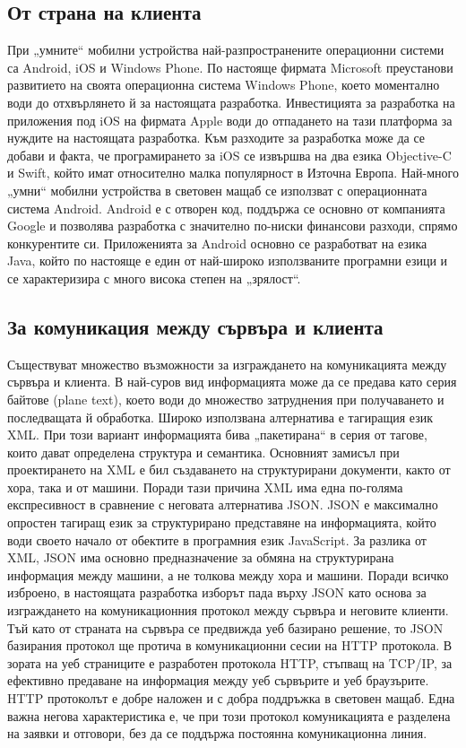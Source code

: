 \documentclass[book,14pt,oneside,openany]{memoir}
\begin{document}
\subsection{От страна на клиента}

При „умните“ мобилни устройства най-разпространените операционни системи са Android, iOS и Windows Phone. По настояще фирмата Microsoft преустанови развитието на своята операционна система Windows Phone, което моментално води до отхвърлянето й за настоящата разработка. Инвестицията за разработка на приложения под iOS на фирмата Apple води до отпадането на тази платформа за нуждите на настоящата разработка. Към разходите за разработка може да се добави и факта, че програмирането за iOS се извършва на два езика Objective-C и Swift, който имат относително малка популярност в Източна Европа. Най-много „умни“ мобилни устройства в световен мащаб се използват с операционната система Android. Android е с отворен код, поддържа се основно от компанията Google и позволява разработка с значително по-ниски финансови разходи, спрямо конкурентите си. Приложенията за Android основно се разработват на езика Java, който по настояще е един от най-широко използваните програмни езици и се характеризира с много висока степен на „зрялост“. 

\subsection{За комуникация между сървъра и клиента}

Съществуват множество възможности за изграждането на комуникацията между сървъра и клиента. В най-суров вид информацията може да се предава като серия байтове (plane text), което води до множество затруднения при получаването и последващата й обработка. Широко използвана алтернатива е тагиращия език XML. При този вариант информацията бива „пакетирана“ в серия от тагове, които дават определена структура и семантика. Основният замисъл при проектирането на XML е бил създаването на структурирани документи, както от хора, така и от машини. Поради тази причина XML има една по-голяма експресивност в сравнение с неговата алтернатива JSON. JSON е максимално опростен тагиращ език за структурирано представяне на информацията, който води своето начало от обектите в програмния език JavaScript. За разлика от XML, JSON има основно предназначение за обмяна на структурирана информация между машини, а не толкова между хора и машини. Поради всичко изброено, в настоящата разработка изборът пада върху JSON като основа за изграждането на комуникационния протокол между сървъра и неговите клиенти. Тъй като от страната на сървъра се предвижда уеб базирано решение, то JSON базирания протокол ще протича в комуникационни сесии на HTTP протокола. В зората на уеб страниците е разработен протокола HTTP, стъпващ на TCP/IP, за ефективно предаване на информация между уеб сървърите и уеб браузърите. HTTP протоколът е добре наложен и с добра поддръжка в световен мащаб. Една важна негова характеристика е, че при този протокол комуникацията е разделена на заявки и отговори, без да се поддържа постоянна комуникационна линия. 
\end{document}
